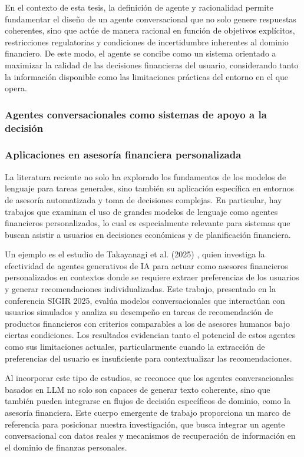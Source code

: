 \documentclass[
	spanish, %
	letterpaper, oneside
]{book}
\begin{document}
En el contexto de esta tesis, la definición de agente y racionalidad permite fundamentar el diseño de un agente conversacional que no solo genere respuestas coherentes, sino que actúe de manera racional en función de objetivos explícitos, restricciones regulatorias y condiciones de incertidumbre inherentes al dominio financiero. De este modo, el agente se concibe como un sistema orientado a maximizar la calidad de las decisiones financieras del usuario, considerando tanto la información disponible como las limitaciones prácticas del entorno en el que opera.

\subsubsection{Agentes conversacionales como sistemas de apoyo a la decisión}
\subsubsection{Aplicaciones en asesoría financiera personalizada}

La literatura reciente no solo ha explorado los fundamentos de los modelos de lenguaje para tareas generales, sino también su aplicación específica en entornos de asesoría automatizada y toma de decisiones complejas. En particular, hay trabajos que examinan el uso de grandes modelos de lenguaje como agentes financieros personalizados, lo cual es especialmente relevante para sistemas que buscan asistir a usuarios en decisiones económicas y de planificación financiera.

Un ejemplo es el estudio de Takayanagi et al. (2025) \cite{takayanagi2025generative}, quien investiga la efectividad de agentes generativos de IA para actuar como asesores financieros personalizados en contextos donde se requiere extraer preferencias de los usuarios y generar recomendaciones individualizadas. Este trabajo, presentado en la conferencia SIGIR 2025, evalúa modelos conversacionales que interactúan con usuarios simulados y analiza su desempeño en tareas de recomendación de productos financieros con criterios comparables a los de asesores humanos bajo ciertas condiciones. Los resultados evidencian tanto el potencial de estos agentes como sus limitaciones actuales, particularmente cuando la extracción de preferencias del usuario es insuficiente para contextualizar las recomendaciones.

Al incorporar este tipo de estudios, se reconoce que los agentes conversacionales basados en LLM no solo son capaces de generar texto coherente, sino que también pueden integrarse en flujos de decisión específicos de dominio, como la asesoría financiera. Este cuerpo emergente de trabajo proporciona un marco de referencia para posicionar nuestra investigación, que busca integrar un agente conversacional con datos reales y mecanismos de recuperación de información en el dominio de finanzas personales.
\end{document}
